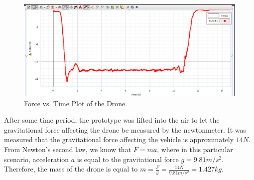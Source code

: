 \begin{figure}[H]
  \centering
    \includegraphics[width=1\textwidth]{images/weightPlot.png}
	\caption{Force vs. Time Plot of the Drone.}
	\label{weightPlot}
\end{figure}

After some time period, the prototype was lifted into the air to let the gravitational force affecting the drone be measured by the newtonmeter. It was measured that the gravitational force affecting the vehicle is approximately $14N$. From Newton's second law, we know that $F = ma$, where in this particular scenario, acceleration $a$ is equal to the gravitational force $g = 9.81m/s^2$. Therefore, the mass of the drone is equal to $m = \frac{F}{g} = \frac{14N}{9.81m/s^2} = 1.427kg$.